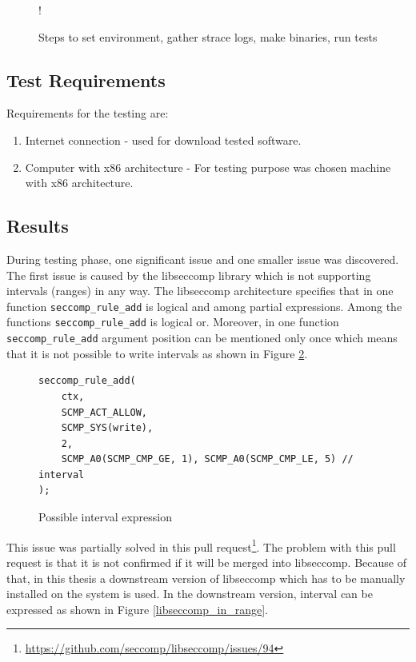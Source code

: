 \begin{figure}[H]
  \centering
   {!} {
    
  }
  \caption{Steps to set environment, gather strace logs, make binaries, run tests}
  \label{fig:tikz:setenv_architecture}
\end{figure}

\subsection{Test Requirements}
Requirements for the testing are:
\begin{enumerate}
	\item Internet connection - used for download tested software.
	\item Computer with x86 architecture - For testing purpose was chosen
	machine with x86 architecture.
\end{enumerate}

\subsection{Results} During testing phase, one significant issue and one smaller issue was
discovered. The first issue is caused by the libseccomp library which is not
supporting intervals (ranges) in any way. The libseccomp architecture specifies
that in one function \texttt{seccomp\_rule\_add} is logical and among partial
expressions. Among the functions \texttt{seccomp\_rule\_add} is logical or.
Moreover, in one function \texttt{seccomp\_rule\_add} argument position can be
mentioned only once which means that it is not possible to write intervals as
shown in Figure \ref{libseccomp_native}.

\begin{figure}[h]
	\label{libseccomp_native}
	\lstset{style=c++}
	\begin{lstlisting}
seccomp_rule_add(
	ctx,
	SCMP_ACT_ALLOW,
	SCMP_SYS(write),
	2,
	SCMP_A0(SCMP_CMP_GE, 1), SCMP_A0(SCMP_CMP_LE, 5) // interval
);
	\end{lstlisting}
	\caption{Possible interval expression}
\end{figure}

This issue was partially solved in this pull
request\footnote{\url{https://github.com/seccomp/libseccomp/issues/94}}. The
problem with this pull request is that it is not confirmed if it will be merged
into libseccomp. Because of that, in this thesis a downstream version of
libseccomp which has to be manually installed on the system is used. In the downstream
version, interval can be expressed as shown in Figure \ref{libseccomp_in_range}.

